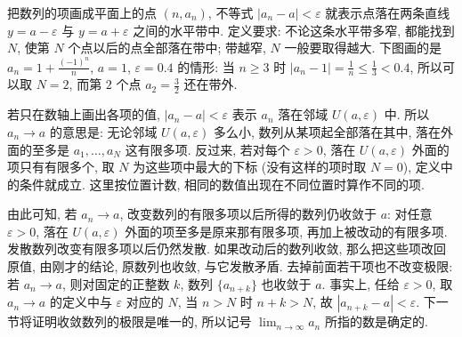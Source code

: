 \documentclass[UTF8,openany]{ctexbook}
\theoremstyle{chinesetextbook}
\begin{document}
把数列的项画成平面上的点 $(n,a_n)$, 不等式 $|a_n-a|<\varepsilon$ 就表示点落在两条直线 $y=a-\varepsilon$ 与 $y=a+\varepsilon$ 之间的水平带中. 定义要求: 不论这条水平带多窄, 都能找到 $N$, 使第 $N$ 个点以后的点全部落在带中; 带越窄, $N$ 一般要取得越大. 下图画的是 $\displaystyle a_n=1+\frac{(-1)^n}n$, $a=1$, $\varepsilon=0.4$ 的情形: 当 $n\ge3$ 时 $\displaystyle|a_n-1|=\frac1n\le\frac13<0.4$, 所以可以取 $N=2$, 而第 $2$ 个点 $\displaystyle a_2=\frac32$ 还在带外.
\begin{center}
\end{center}

若只在数轴上画出各项的值, $|a_n-a|<\varepsilon$ 表示 $a_n$ 落在邻域 $U(a,\varepsilon)$ 中. 所以 $a_n\to a$ 的意思是: 无论邻域 $U(a,\varepsilon)$ 多么小, 数列从某项起全部落在其中, 落在外面的至多是 $a_1,\ldots,a_N$ 这有限多项. 反过来, 若对每个 $\varepsilon>0$, 落在 $U(a,\varepsilon)$ 外面的项只有有限多个, 取 $N$ 为这些项中最大的下标 (没有这样的项时取 $N=0$), 定义中的条件就成立. 这里按位置计数, 相同的数值出现在不同位置时算作不同的项.

由此可知, 若 $a_n\to a$, 改变数列的有限多项以后所得的数列仍收敛于 $a$: 对任意 $\varepsilon>0$, 落在 $U(a,\varepsilon)$ 外面的项至多是原来那有限多项, 再加上被改动的有限多项. 发散数列改变有限多项以后仍然发散. 如果改动后的数列收敛, 那么把这些项改回原值, 由刚才的结论, 原数列也收敛, 与它发散矛盾. 去掉前面若干项也不改变极限: 若 $a_n\to a$, 则对固定的正整数 $k$, 数列 $\{a_{n+k}\}$ 也收敛于 $a$. 事实上, 任给 $\varepsilon>0$, 取 $a_n\to a$ 的定义中与 $\varepsilon$ 对应的 $N$, 当 $n>N$ 时 $n+k>N$, 故 $|a_{n+k}-a|<\varepsilon$. 下一节将证明收敛数列的极限是唯一的, 所以记号 $\displaystyle\lim_{n\to\infty}a_n$ 所指的数是确定的.
\end{document}
